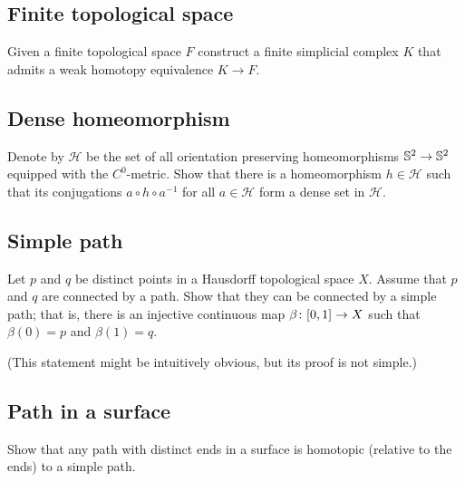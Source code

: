 \subsection*{Finite topological space\easy}\label{Finite topological space}


\begin{pr}
Given a finite topological space $F$ 
construct a finite simplicial complex $K$
that admits a weak homotopy equivalence  $K\to F$. 
\end{pr}

\subsection*{Dense homeomorphism\easy}\label{Dense homeomorphism}

\begin{pr}
Denote by $\mathcal{H}$ be the set of all orientation preserving homeomorphisms $\mathbb {S}^2\z\to\mathbb {S}^2$ 
equipped with the $C^0$-metric.
Show that there is a homeomorphism $h\in \mathcal{H}$ such that its conjugations $a\circ h\circ a^{-1}$ for all $a\in\mathcal{H}$ form a dense set in $\mathcal{H}$.
 
\end{pr}

\subsection*{Simple path\easy}
\label{Simple path}

\begin{pr}
Let $p$ and $q$ be distinct points in a Hausdorff topological space $X$.
Assume that $p$ and $q$ are connected by a path.
Show that they can be connected by a simple path;
that is, there is an injective continuous map $\beta\:[0,1]\z\to X$
such that $\beta(0)=p$ and $\beta(1)=q$.
\end{pr}

(This statement might be intuitively obvious, but its proof is not simple.)

\subsection*{Path in a surface\easy}
\label{Path in a surface}

\begin{pr}
Show that any path with distinct ends in a surface is homotopic (relative to the ends) to a simple path.  
\end{pr}






